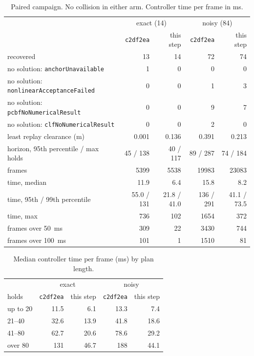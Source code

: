 \documentclass[11pt]{article}
\begin{document}
\begin{table}[h]
\centering\small
\caption{Paired campaign. No collision in either arm. Controller time per
frame in ms.}
\begin{tabular}{lrrrr}
\toprule
 & \multicolumn{2}{c}{exact (14)} & \multicolumn{2}{c}{noisy (84)}\\
 & \texttt{c2df2ea} & this step & \texttt{c2df2ea} & this step\\
\midrule
recovered & 13 & 14 & 72 & 74\\
no solution: \texttt{anchorUnavailable} & 1 & 0 & 0 & 0\\
no solution: \texttt{nonlinearAcceptanceFailed} & 0 & 0 & 1 & 3\\
no solution: \texttt{pcbfNoNumericalResult} & 0 & 0 & 9 & 7\\
no solution: \texttt{clfNoNumericalResult} & 0 & 0 & 2 & 0\\
least replay clearance (m) & 0.001 & 0.136 & 0.391 & 0.213\\
horizon, 95th percentile / max holds & 45 / 138 & 40 / 117 & 89 / 287 & 74 / 184\\
frames & 5399 & 5538 & 19983 & 23083\\
time, median & 11.9 & 6.4 & 15.8 & 8.2\\
time, 95th / 99th percentile & 55.0 / 131 & 21.8 / 41.0 & 136 / 291 & 41.1 / 73.5\\
time, max & 736 & 102 & 1654 & 372\\
frames over 50~ms & 309 & 22 & 3430 & 744\\
frames over 100~ms & 101 & 1 & 1510 & 81\\
\bottomrule
\end{tabular}
\end{table}

\begin{table}[h]
\centering\small
\caption{Median controller time per frame (ms) by plan length.}
\begin{tabular}{lrrrr}
\toprule
 & \multicolumn{2}{c}{exact} & \multicolumn{2}{c}{noisy}\\
holds & \texttt{c2df2ea} & this step & \texttt{c2df2ea} & this step\\
\midrule
up to 20 & 11.5 & 6.1 & 13.3 & 7.4\\
21--40 & 32.6 & 13.9 & 41.8 & 18.6\\
41--80 & 62.7 & 20.6 & 78.6 & 29.2\\
over 80 & 131 & 46.7 & 188 & 44.1\\
\bottomrule
\end{tabular}
\end{table}
\end{document}
